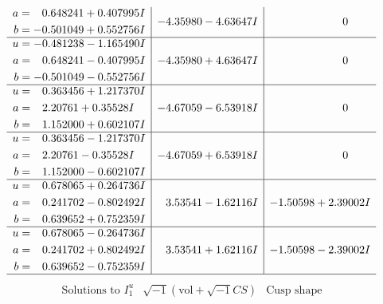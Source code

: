 \documentclass[1p]{elsarticle_modified}
\theoremstyle{definition}
\newcommand{\I}{\sqrt{-1}}
\begin{document}
$$\begin{array}{c|c|c}
\begin{aligned}
a &= \phantom{-}0.648241 + 0.407995 I \\
b &= -0.501049 + 0.552756 I\end{aligned}
 & -4.35980 - 4.63647 I & \phantom{-0.000000 } 0 \\ \hline\begin{aligned}
u &= -0.481238 - 1.165490 I \\
a &= \phantom{-}0.648241 - 0.407995 I \\
b &= -0.501049 - 0.552756 I\end{aligned}
 & -4.35980 + 4.63647 I & \phantom{-0.000000 } 0 \\ \hline\begin{aligned}
u &= \phantom{-}0.363456 + 1.217370 I \\
a &= \phantom{-}2.20761 + 0.35528 I \\
b &= \phantom{-}1.152000 + 0.602107 I\end{aligned}
 & -4.67059 - 6.53918 I & \phantom{-0.000000 } 0 \\ \hline\begin{aligned}
u &= \phantom{-}0.363456 - 1.217370 I \\
a &= \phantom{-}2.20761 - 0.35528 I \\
b &= \phantom{-}1.152000 - 0.602107 I\end{aligned}
 & -4.67059 + 6.53918 I & \phantom{-0.000000 } 0 \\ \hline\begin{aligned}
u &= \phantom{-}0.678065 + 0.264736 I \\
a &= \phantom{-}0.241702 - 0.802492 I \\
b &= \phantom{-}0.639652 + 0.752359 I\end{aligned}
 & \phantom{-}3.53541 - 1.62116 I & -1.50598 + 2.39002 I \\ \hline\begin{aligned}
u &= \phantom{-}0.678065 - 0.264736 I \\
a &= \phantom{-}0.241702 + 0.802492 I \\
b &= \phantom{-}0.639652 - 0.752359 I\end{aligned}
 & \phantom{-}3.53541 + 1.62116 I & -1.50598 - 2.39002 I\\
 \hline 
 \end{array}$$\newpage$$\begin{array}{c|c|c}  
\text{Solutions to }I^u_{1}& \I (\text{vol} + \sqrt{-1}CS) & \text{Cusp shape}\\
 \hline 
\begin{aligned}

\end{aligned}
\end{array}$$
\end{document}
